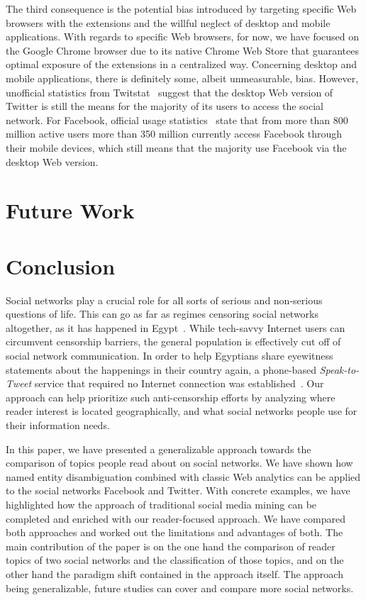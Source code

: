 \documentclass{iosart2c}
\begin{document}
The third consequence is the potential bias introduced by targeting specific Web browsers with the extensions and the willful neglect of desktop and mobile applications. 
With regards to specific Web browsers, for now, we have focused on the Google Chrome browser due to its native Chrome Web Store that guarantees optimal exposure of the extensions in a centralized way.
Concerning desktop and mobile applications, there is definitely some, albeit unmeasurable, bias.
However, unofficial statistics from Twitstat~\cite{twitstat} suggest that the desktop Web version of Twitter is still the means for the majority of its users to access the social network.
For Facebook, official usage statistics~\cite{facebookstats} state that from more than 800 million active users more than 350 million currently access Facebook through their mobile devices, which still means that the majority use Facebook via the desktop Web version.

\section{Future Work} \label{sec:futurework}


\section{Conclusion} \label{sec:conclusion}
Social networks play a crucial role for all sorts of serious and non-serious questions of life.
This can go as far as regimes censoring social networks altogether, as it has happened in Egypt~\cite{censor}.
While tech-savvy Internet users can circumvent censorship barriers, the general population is effectively cut off of social network communication.
In order to help Egyptians share eyewitness statements about the happenings in their country again, a phone-based \emph{Speak-to-Tweet} service that required no Internet connection was established~\cite{egypt}.
Our approach can help prioritize such anti-censorship efforts by analyzing where reader interest is located geographically, and what social networks people use for their information needs.

In this paper, we have presented a generalizable approach towards the comparison of topics people read about on social networks.
We have shown how named entity disambiguation combined with classic Web analytics can be applied to the social networks Facebook and Twitter.
With concrete examples, we have highlighted how the approach of traditional social media mining can be completed and enriched with our reader-focused approach.
We have compared both approaches and worked out the limitations and advantages of both.
The main contribution of the paper is on the one hand the comparison of reader topics of two social networks and the classification of those topics, and on the other hand the paradigm shift contained in the approach itself.
The approach being generalizable, future studies can cover and compare more social networks.
\end{document}
